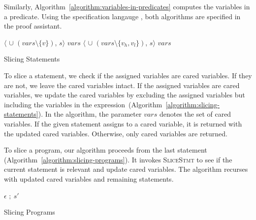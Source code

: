 Similarly, Algorithm~\ref{algorithm:variables-in-predicates} computes
the variables in a predicate. Using the \coq specification
langauge \gallina, both algorithms are specified in the proof
assistant.

\begin{algorithm}
  \begin{algorithmic}[1]
          {\Return $\langle$ 
            $\cup$ $(\mathit{vars} \setminus \{ v \})$, $s \rangle$}
          {\Return $\mathit{vars}$}
      \EndCase
          {\Return $\langle$ $\cup$ 
            $(\mathit{vars} \setminus \{ v_h, v_l \})$, $s \rangle$}
          {\Return $\mathit{vars}$}
      \EndCase
    \EndMatch
    \EndFunction
  \end{algorithmic}
  \caption{Slicing Statements}
  \label{algorithm:slicing-statements}
\end{algorithm}

To slice a statement, we check if the assigned variables are
cared variables. If they are not, we leave the cared
variables intact. 
If the assigned variables are cared variables, we update the cared
variables by excluding the assigned variables but including
the variables in the
expression~(Algorithm~\ref{algorithm:slicing-statements}). In the
algorithm,  
the parameter $\mathit{vars}$ denotes the set of cared variables.
If the given statement assigns to a cared variable, it is
returned with the updated cared variables. Otherwise, only
cared variables are returned.

To slice a program, our algorithm proceeds from the last statement
(Algorithm~\ref{algorithm:slicing-programs}). It invokes
\textsc{SliceStmt} to see if the current statement is relevant
and update cared variables. The algorithm recurses with
updated cared variables and remaining statements.

\begin{algorithm}
  \begin{algorithmic}[1]
      \Case{$\epsilon$}
        \Return $\epsilon$
      \EndCase
            \Return {}
          \EndCase
            \Return {}$;\ s'$
          \EndCase
        \EndMatch
      \EndCase
    \EndMatch
    \EndFunction
  \end{algorithmic}
  \caption{Slicing Programs}
  \label{algorithm:slicing-programs}
\end{algorithm}

